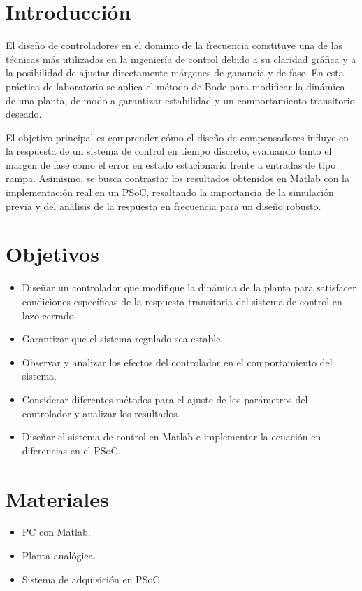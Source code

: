 
\section{Introducción}

El diseño de controladores en el dominio de la frecuencia constituye una de las técnicas más utilizadas en la ingeniería de control debido a su claridad gráfica y a la posibilidad de ajustar directamente márgenes de ganancia y de fase.  
En esta práctica de laboratorio se aplica el método de Bode para modificar la dinámica de una planta, de modo a garantizar estabilidad y un comportamiento transitorio deseado.  

El objetivo principal es comprender cómo el diseño de compensadores influye en la respuesta de un sistema de control en tiempo discreto, evaluando tanto el margen de fase como el error en estado estacionario frente a entradas de tipo rampa.  
Asimismo, se busca contrastar los resultados obtenidos en Matlab con la implementación real en un PSoC, resaltando la importancia de la simulación previa y del análisis de la respuesta en frecuencia para un diseño robusto.


\section{Objetivos}
\begin{itemize}
	\item Diseñar un controlador que modifique la dinámica de la planta para satisfacer condiciones específicas de la respuesta transitoria del sistema de control en lazo cerrado.
	\item Garantizar que el sistema regulado sea estable.
	\item Observar y analizar los efectos del controlador en el comportamiento del sistema.
	\item Considerar diferentes métodos para el ajuste de los parámetros del controlador y analizar los resultados.
	\item Diseñar el sistema de control en Matlab e implementar la ecuación en diferencias en el PSoC.
\end{itemize}


\section{Materiales}
\begin{itemize}
	\item PC con Matlab.
	\item Planta analógica.
	\item Sistema de adquisición en PSoC.
\end{itemize}

